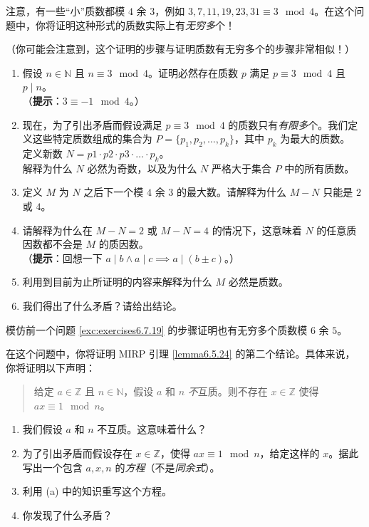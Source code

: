 \begin{exercise}\label{exc:exercises6.7.19}
    注意，有一些``小''质数都模 $4$ 余 $3$，例如 $3, 7, 11, 19, 23, 31 \equiv 3 \mod 4$。在这个问题中，你将证明这种形式的质数实际上有\emph{无穷多}个！

    （你可能会注意到，这个证明的步骤与证明质数有无穷多个的步骤非常相似！）
    \begin{enumerate}[label=(\alph*)]
        \item 假设 $n \in \mathbb{N}$ 且 $n \equiv 3 \mod 4$。证明必然存在质数 $p$ 满足 $p \equiv 3 \mod 4$ 且 $p \mid n$。\\
        （\textbf{提示}：$3 \equiv -1 \mod 4$。）
        \item 现在，为了引出矛盾而假设满足 $p \equiv 3 \mod 4$ 的质数只有\emph{有限多}个。我们定义这些特定质数组成的集合为 $P = \{p_1, p_2, \dots, p_k\}$，其中 $p_k$ 为最大的质数。\\
        定义新数 $N = p1 \cdot p2 \cdot p3 \cdot \dots \cdot p_k$。\\
        解释为什么 $N$ 必然为奇数，以及为什么 $N$ 严格大于集合 $P$ 中的所有质数。
        \item 定义 $M$ 为 $N$ 之后下一个模 $4$ 余 $3$ 的最大数。请解释为什么 $M - N$ 只能是 $2$ 或 $4$。
        \item 请解释为什么在 $M - N = 2$ 或 $M - N = 4$ 的情况下，这意味着 $N$ 的任意质因数都不会是 $M$ 的质因数。\\
        （\textbf{提示}：回想一下 $a \mid b \land a \mid c \implies a \mid (b \pm c)$。）
        \item 利用到目前为止所证明的内容来解释为什么 $M$ 必然是质数。
        \item 我们得出了什么矛盾？请给出结论。
    \end{enumerate}
\end{exercise}

\begin{exercise}
    模仿前一个问题 \ref{exc:exercises6.7.19} 的步骤证明也有无穷多个质数模 $6$ 余 $5$。
\end{exercise}

\begin{exercise}\label{exc:exercises6.7.21}
    在这个问题中，你将证明 MIRP 引理 \ref{lemma6.5.24} 的第二个结论。具体来说，你将证明以下声明：
    \begin{quote}
        给定 $a \in \mathbb{Z}$ 且 $n \in \mathbb{N}$，假设 $a$ 和 $n$ \emph{不}互质。则不存在 $x \in \mathbb{Z}$ 使得 $ax \equiv 1 \mod n$。
    \end{quote}
    \begin{enumerate}[label=(\alph*)]
        \item 我们假设 $a$ 和 $n$ 不互质。这意味着什么？
        \item 为了引出矛盾而假设存在 $x \in \mathbb{Z}$，使得 $ax \equiv 1 \mod n$，给定这样的 $x$。据此写出一个包含 $a,x,n$ 的\emph{方程}（不是\emph{同余式}）。
        \item 利用 (a) 中的知识重写这个方程。
        \item 你发现了什么矛盾？
    \end{enumerate}
\end{exercise}

